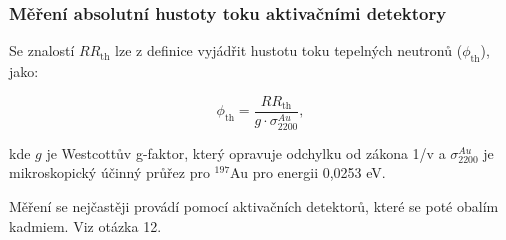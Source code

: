 \subsubsection{Měření absolutní hustoty toku aktivačními detektory}

Se znalostí $RR_\text{th}$ lze z definice vyjádřit hustotu toku tepelných neutronů ($\phi_\text{th}$), jako:

\begin{equation} \label{phith}
   \phi_\text{th} = \frac{RR_\text{th}}{g \cdot \sigma^{Au}_\text{2200}},
\end{equation}

kde $g$ je Westcottův g-faktor, který opravuje odchylku od zákona 1/v a $\sigma^{Au}_\text{2200}$ je mikroskopický účinný průřez pro $^{197}$Au pro energii 0,0253 eV.

Měření se nejčastěji provádí pomocí aktivačních detektorů, které se poté obalím kadmiem. Viz otázka 12.

